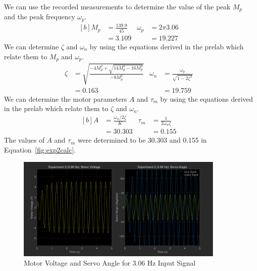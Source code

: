 \documentclass[12pt]{article}
\begin{document}
We can use the recorded measurements to determine the value of the peak $M_p$ and the peak frequency $\omega_p$.
\begin{equation*}
\begin{aligned}[b]
    M_p &= \frac{139.9}{45} & \omega_p &= 2\pi3.06 \\
    &= 3.109 & &= 19.227
\end{aligned}
\end{equation*}
We can determine $\zeta$ and $\omega_n$ by using the equations derived in the prelab which relate them to $M_p$ and $\omega_p$.
\begin{equation*}
\begin{aligned}
    \zeta &= \sqrt{\frac{-4M_p^2 + \sqrt{14M_p^4 - 16M_p^2}}{-8M_p^2}} & \omega_n &= \frac{\omega_p}{\sqrt{1-2\zeta^2}} \\
    &= 0.163 & &= 19.759
\end{aligned}
\end{equation*}
We can determine the motor parameters $A$ and $\tau_m$ by using the equations derived in the prelab which relate them to $\zeta$ and $\omega_n$.
\begin{equation} \label{fig:exp2calc}
\begin{aligned}[b]
    A &= \frac{\omega_n / 2\zeta}{K} & \tau_m &= \frac{1}{2\omega_n\zeta} \\
    &= 30.303 & &= 0.155
\end{aligned}
\end{equation}
The values of $A$ and $\tau_m$ were determined to be 30.303 and 0.155 in Equation~\ref{fig:exp2calc}.

\begin{figure}[h!]
    \centering
    \includegraphics[width=0.9\textwidth]{exp2_3.06}
    \caption{\label{fig:exp2_3.06}Motor Voltage and Servo Angle for 3.06 Hz Input Signal}
\end{figure}
\end{document}
